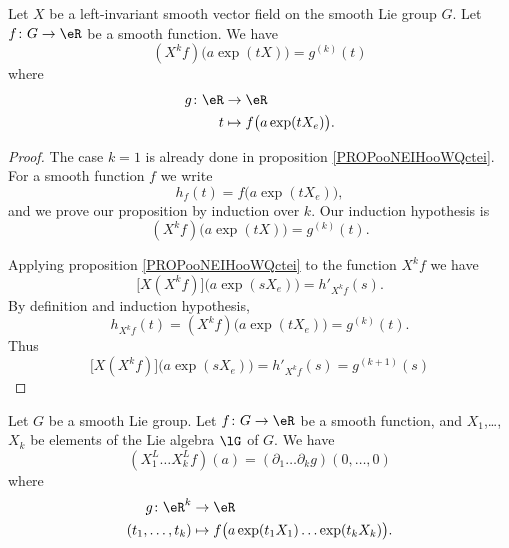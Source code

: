 \begin{proposition}	\label{PROPooPEKNooUAeMjp}
	Let \( X\) be a left-invariant smooth vector field on the smooth Lie group \( G\). Let \(f \colon G\to \eR  \) be a smooth function. We have
	\begin{equation}
		(X^kf)\big( a\exp(tX) \big)=g^{(k)}(t)
	\end{equation}
	where
	\begin{equation}
		\begin{aligned}
			g\colon \eR & \to \eR                              \\
			t           & \mapsto    f\big( a\exp(tX_e) \big).
		\end{aligned}
	\end{equation}
\end{proposition}

\begin{proof}
	The case \( k=1\) is already done in proposition \ref{PROPooNEIHooWQctei}. For a smooth function \( f\) we write
	\begin{equation}
		h_f(t)=f\big( a\exp(tX_e) \big),
	\end{equation}
	and we prove our proposition by induction over \( k\). Our induction hypothesis is
	\begin{equation}
		(X^kf)\big( a\exp(tX) \big)=g^{(k)}(t).
	\end{equation}

	Applying proposition \ref{PROPooNEIHooWQctei} to the function \( X^kf\) we have
	\begin{equation}
		\big[ X(X^kf) \big]\big( a\exp(sX_e) \big)=h'_{X^kf}(s).
	\end{equation}
	By definition and induction hypothesis,
	\begin{equation}
		h_{X^kf}(t)=(X^kf)\big( a\exp(tX_e) \big)=g^{(k)}(t).
	\end{equation}
	Thus
	\begin{equation}
		\big[ X(X^kf) \big]\big( a\exp(sX_e) \big)=h'_{X^kf}(s)=g^{(k+1)}(s)
	\end{equation}
\end{proof}

\begin{proposition}	\label{PROPooXCMUooJqsTvB}
	Let \( G\) be a smooth Lie group. Let \(f \colon G\to \eR  \) be a smooth function, and \( X_1\),\ldots, \( X_k\) be elements of the Lie algebra \( \lG\) of \( G\). We have
	\begin{equation}
		(X_1^L\ldots X_k^Lf)(a)=(\partial_1\ldots\partial_kg)(0,\ldots,0)
	\end{equation}
	where
	\begin{equation}
		\begin{aligned}
			g\colon \eR^k    & \to \eR                                                \\
			(t_1,\ldots,t_k) & \mapsto f\big( a\exp(t_1X_1)\ldots \exp(t_kX_k) \big).
		\end{aligned}
	\end{equation}
\end{proposition}

